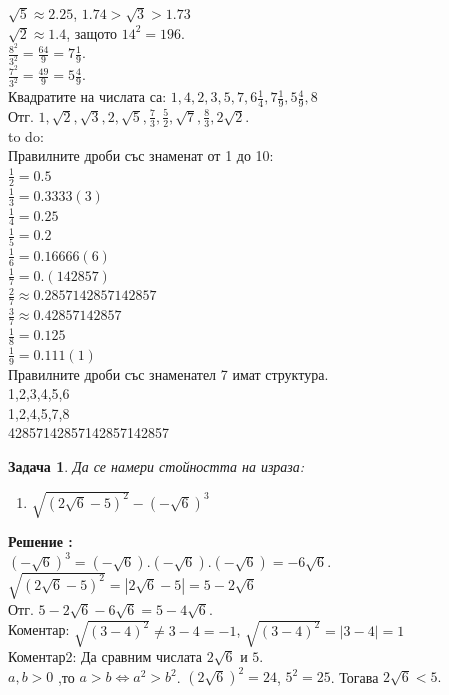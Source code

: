 \documentclass{article}
\newtheorem{problem}{Задача}
\newcounter{solution}
\newcommand\solution{%
	\stepcounter{solution}%
	\textbf{Решение :}\\%
}
\begin{document}
$\sqrt{5} \approx 2.25$, $ 1.74 >\sqrt 3 > 1.73 $ \\
$\sqrt 2 \approx 1.4 $, защото $14^2 = 196 $. \\
$\frac{8^2}{3^2} = \frac{64}{9} = 7 \frac{1}{9} $. \\
$\frac{7^2}{3^2} = \frac{49}{9} = 5 \frac{4}{9} $. \\
Квадратите на числата са:
$1,4,2,3,5,7, 6\frac{1}{4}, 7 \frac{1}{9}, 5 \frac{4}{9},8  $ \\
Отг. 
$1, \sqrt 2, \sqrt 3, 2, \sqrt 5, \frac{7}{3}, \frac{5}{2}, \sqrt 7 , \frac{8}{3}, 2\sqrt2 $. \\


\vspace{2cm}
to do: \\
Правилните дроби със знаменат от 1 до 10: \\
$\frac{1}{2} = 0.5  $ \\
$\frac{1}{3} = 0.3333(3) $  \\
$\frac{1}{4} = 0.25  $ \\
$\frac{1}{5} = 0.2  $ \\
$\frac{1}{6} = 0.16666(6) $ \\
$\frac{1}{7} = 0.(142857) $ \\

$\frac{2}{7} \approx 0.2857142857142857 $ \\
$\frac{3}{7} \approx 0.42857142857 $ \\
$\frac{1}{8} = 0.125 $ \\
$\frac{1}{9} = 0.111(1) $ \\

\noindent
Правилните дроби със знаменател 7 имат структура. \\
1,2,3,4,5,6\\
1,2,4,5,7,8 \\
42857142857142857142857 \\
      
 \vspace{2cm}
 
\begin{problem}
Да се намери стойността на израза:
\begin{enumerate}
	\item $\sqrt{(2\sqrt{6} - 5 )^2} - (-\sqrt{6})^3$
\end{enumerate}	
\end{problem}
\solution

$ (-\sqrt{6})^3 =(-\sqrt{6}).(-\sqrt{6}).(-\sqrt{6}) = -6\sqrt{6}. $ \\
$\sqrt{(2\sqrt{6} - 5 )^2} = | 2\sqrt{6} - 5 | = 5 - 2\sqrt6$ \\
Отг. $ 5 - 2\sqrt 6 - 6\sqrt{6} = 5 - 4\sqrt{6} $. \\
Коментар: $\sqrt{(3-4)^2} \neq 3-4 = -1 $, $\sqrt{(3-4)^2} = | 3-4| = 1$  \\
Коментар2: Да сравним числата $2\sqrt6$ и $5.$ \\
$a,b >0 $ ,то $a>b \iff a^2 > b^2 $. 
$(2\sqrt 6)^2 = 24$, $5^2 = 25 $. Тогава  $2\sqrt6 < 5.$
\end{document}
